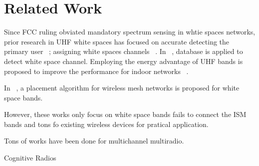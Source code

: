 \section{Related Work}
\label{sec:related}
Since FCC ruling obviated mandatory spectrum sensing in whtie spaces networks, prior research in UHF white spaces has focused on accurate detecting the primary user ~\cite{kim2008fast}; assigning white spaces channels ~\cite{bahl2009white}.
In ~\cite{murty2012senseless}, database is applied to detect white space channel.
Employing the energy advantage of UHF bands is proposed to improve the performance for indoor networks ~\cite{radunovic2010rethinking}.   


In ~\cite{robinson2010deploying}, a placement algorithm for wireless mesh networks is proposed for white space bands.

However, these works only focus on white space bands fails to connect the ISM bands and tons fo existing wireless devices for pratical application.

 Tons of works have been done for multichannel multiradio.

 Cognitive Radios





 
